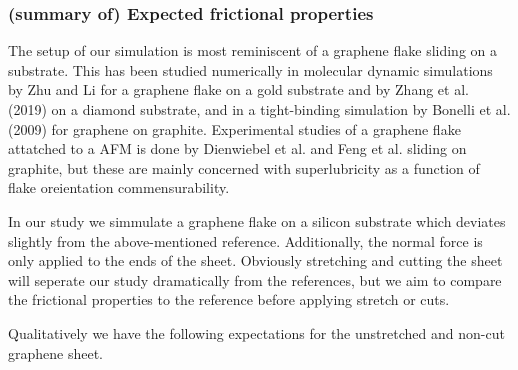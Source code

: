 \subsubsection{(summary of) Expected frictional properties}



The setup of our simulation is most reminiscent of a graphene flake sliding on a substrate. This has been studied numerically in molecular dynamic simulations by Zhu and Li \cite[2018]{zhu_study_2018} for a graphene flake on a gold substrate and by Zhang et al. \cite{ma12091425}(2019) on a diamond substrate, and in a tight-binding simulation by Bonelli et al. \cite{bonelli_atomistic_2009}(2009) for graphene on graphite. Experimental studies of a graphene flake attatched to a AFM is done by Dienwiebel et al. \cite[2005]{DIENWIEBEL2005197} and Feng et al. \cite[2013]{feng_superlubric_2013} sliding on graphite, but these are mainly concerned with superlubricity as a function of flake oreientation commensurability. 


In our study we simmulate a graphene flake on a silicon substrate which deviates slightly from the above-mentioned reference. Additionally, the normal force is only applied to the ends of the sheet. Obviously stretching and cutting the sheet will seperate our study dramatically from the references, but we aim to compare the frictional properties to the reference before applying stretch or cuts. 

Qualitatively we have the following expectations for the unstretched and non-cut graphene sheet. 



